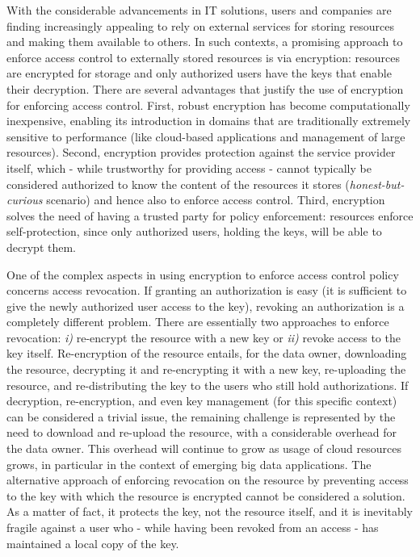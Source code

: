 With the considerable advancements in IT solutions, users and companies are finding increasingly appealing to rely on external services for storing resources and making them available to others. In such contexts, a promising approach to enforce access control to externally stored resources is via encryption: resources are encrypted for storage and only authorized users have the keys that enable their decryption. There are several advantages that justify the use of encryption for enforcing access control. First, robust encryption has become computationally inexpensive, enabling its introduction in domains that are traditionally extremely sensitive to performance (like cloud-based applications and management of large resources). Second, encryption provides protection against the service provider itself, which - while trustworthy for providing access - cannot typically be considered authorized to know the content of the resources it stores ({\em honest-but-curious\/} scenario) and hence also to enforce access control. Third, encryption solves the need of having a trusted party for policy enforcement: resources enforce self-protection, since only authorized users, holding the keys, will be able to decrypt them.

One of the complex aspects in using encryption to enforce access control policy concerns access revocation. If granting an authorization is easy (it is sufficient to give the newly authorized user access to the key), revoking an authorization is a completely different problem. There are essentially two approaches to enforce revocation: {\em i)\/} re-encrypt the resource with a new key or {\em ii)\/} revoke access to the key itself. Re-encryption of the resource entails, for the data owner, downloading the resource, decrypting it and re-encrypting it with a new key, re-uploading the resource, and re-distributing the key to the users who still hold authorizations. If decryption, re-encryption, and even key management (for this specific context) can be considered a trivial issue, the remaining challenge is represented by the need to download and re-upload the resource, with a considerable overhead for the data owner. This overhead will continue to grow as usage of cloud resources grows, in particular in the context of emerging big data applications. The alternative approach of enforcing revocation on the resource by preventing access to the key with which the resource is encrypted cannot be considered a solution. As a matter of fact, it protects the key, not the resource itself, and it is inevitably fragile against a user who - while having been revoked from an access - has maintained a local copy of the key.

